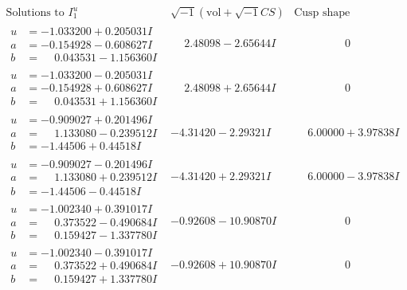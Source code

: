 \documentclass[1p]{elsarticle_modified}
\theoremstyle{definition}
\newcommand{\I}{\sqrt{-1}}
\begin{document}
$$\begin{array}{c|c|c}  
\text{Solutions to }I^u_{1}& \I (\text{vol} + \sqrt{-1}CS) & \text{Cusp shape}\\
 \hline 
\begin{aligned}
u &= -1.033200 + 0.205031 I \\
a &= -0.154928 - 0.608627 I \\
b &= \phantom{-}0.043531 - 1.156360 I\end{aligned}
 & \phantom{-}2.48098 - 2.65644 I & \phantom{-0.000000 } 0 \\ \hline\begin{aligned}
u &= -1.033200 - 0.205031 I \\
a &= -0.154928 + 0.608627 I \\
b &= \phantom{-}0.043531 + 1.156360 I\end{aligned}
 & \phantom{-}2.48098 + 2.65644 I & \phantom{-0.000000 } 0 \\ \hline\begin{aligned}
u &= -0.909027 + 0.201496 I \\
a &= \phantom{-}1.133080 - 0.239512 I \\
b &= -1.44506 + 0.44518 I\end{aligned}
 & -4.31420 - 2.29321 I & \phantom{-}6.00000 + 3.97838 I \\ \hline\begin{aligned}
u &= -0.909027 - 0.201496 I \\
a &= \phantom{-}1.133080 + 0.239512 I \\
b &= -1.44506 - 0.44518 I\end{aligned}
 & -4.31420 + 2.29321 I & \phantom{-}6.00000 - 3.97838 I \\ \hline\begin{aligned}
u &= -1.002340 + 0.391017 I \\
a &= \phantom{-}0.373522 - 0.490684 I \\
b &= \phantom{-}0.159427 - 1.337780 I\end{aligned}
 & -0.92608 - 10.90870 I & \phantom{-0.000000 } 0 \\ \hline\begin{aligned}
u &= -1.002340 - 0.391017 I \\
a &= \phantom{-}0.373522 + 0.490684 I \\
b &= \phantom{-}0.159427 + 1.337780 I\end{aligned}
 & -0.92608 + 10.90870 I & \phantom{-0.000000 } 0 \\ \hline\begin{aligned}

\end{aligned}
\end{array}$$
\end{document}
